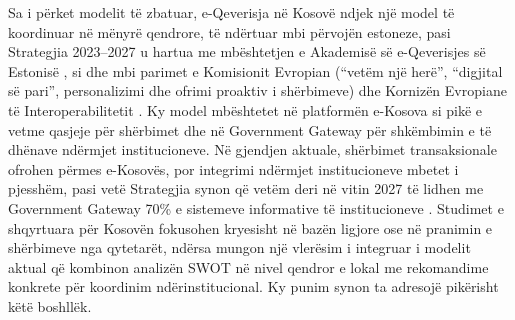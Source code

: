 \documentclass[conference]{IEEEtran}
\begin{document}
Sa i përket modelit të zbatuar, e-Qeverisja në Kosovë ndjek një model të koordinuar në mënyrë qendrore, të ndërtuar mbi përvojën estoneze, pasi Strategjia 2023–2027 u hartua me mbështetjen e Akademisë së e-Qeverisjes së Estonisë \cite{r10}, si dhe mbi parimet e Komisionit Evropian (“vetëm një herë”, “digjital së pari”, personalizimi dhe ofrimi proaktiv i shërbimeve) dhe Kornizën Evropiane të Interoperabilitetit \cite{r4}. Ky model mbështetet në platformën e-Kosova si pikë e vetme qasjeje për shërbimet dhe në Government Gateway për shkëmbimin e të dhënave ndërmjet institucioneve. Në gjendjen aktuale, shërbimet transaksionale ofrohen përmes e-Kosovës, por integrimi ndërmjet institucioneve mbetet i pjesshëm, pasi vetë Strategjia synon që vetëm deri në vitin 2027 të lidhen me Government Gateway 70\% e sistemeve informative të institucioneve \cite{r4}. Studimet e shqyrtuara për Kosovën fokusohen kryesisht në bazën ligjore ose në pranimin e shërbimeve nga qytetarët, ndërsa mungon një vlerësim i integruar i modelit aktual që kombinon analizën SWOT në nivel qendror e lokal me rekomandime konkrete për koordinim ndërinstitucional. Ky punim synon ta adresojë pikërisht këtë boshllëk.
\end{document}
